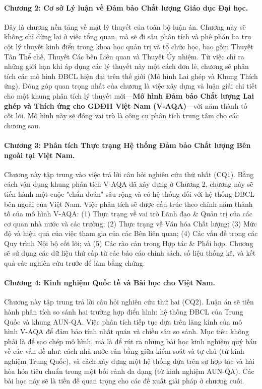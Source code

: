 \documentclass[12pt, a4paper, openany]{report}
\begin{document}
\paragraph{Chương 2: Cơ sở Lý luận về Đảm bảo Chất lượng Giáo dục Đại học.}
Đây là chương nền tảng về mặt lý thuyết của toàn bộ luận án. Chương này sẽ không chỉ dừng lại ở việc tổng quan, mà sẽ đi sâu phân tích và phê phán ba trụ cột lý thuyết kinh điển trong khoa học quản trị và tổ chức học, bao gồm Thuyết Tân Thể chế, Thuyết Các bên Liên quan và Thuyết Ủy nhiệm. Từ việc chỉ ra những giới hạn khi áp dụng các lý thuyết này một cách đơn lẻ, chương sẽ phân tích các mô hình ĐBCL hiện đại trên thế giới (Mô hình Lai ghép và Khung Thích ứng). Đóng góp quan trọng nhất của chương là việc xây dựng và luận giải chi tiết cho một khung phân tích lý thuyết mới—\textbf{Mô hình Đảm bảo Chất lượng Lai ghép và Thích ứng cho GDĐH Việt Nam (V-AQA)}—với năm thành tố cốt lõi. Mô hình này sẽ đóng vai trò là công cụ phân tích trung tâm cho các chương sau.

\paragraph{Chương 3: Phân tích Thực trạng Hệ thống Đảm bảo Chất lượng Bên ngoài tại Việt Nam.}
Chương này tập trung vào việc trả lời câu hỏi nghiên cứu thứ nhất (CQ1). Bằng cách vận dụng khung phân tích V-AQA đã xây dựng ở Chương 2, chương này sẽ tiến hành một cuộc "chẩn đoán" sâu rộng và có hệ thống đối với hệ thống ĐBCL bên ngoài của Việt Nam. Việc phân tích sẽ được cấu trúc theo chính năm thành tố của mô hình V-AQA: (1) Thực trạng về vai trò Lãnh đạo \& Quản trị của các cơ quan nhà nước và các trường; (2) Thực trạng về Văn hóa Chất lượng; (3) Mức độ và hiệu quả của việc tham gia của các Bên liên quan; (4) Các vấn đề trong các Quy trình Nội bộ cốt lõi; và (5) Các rào cản trong Hợp tác \& Phối hợp. Chương sẽ sử dụng các dữ liệu thứ cấp từ các báo cáo chính sách, số liệu thống kê, và kết quả các nghiên cứu trước để làm bằng chứng.

\paragraph{Chương 4: Kinh nghiệm Quốc tế và Bài học cho Việt Nam.}
Chương này tập trung trả lời câu hỏi nghiên cứu thứ hai (CQ2). Luận án sẽ tiến hành phân tích so sánh hai trường hợp điển hình: hệ thống ĐBCL của Trung Quốc và khung AUN-QA. Việc phân tích tiếp tục dựa trên lăng kính của mô hình V-AQA để đảm bảo tính nhất quán và chiều sâu so sánh. Mục tiêu không phải là để sao chép mô hình, mà là để rút ra những bài học kinh nghiệm quý báu về các vấn đề như: cách nhà nước cân bằng giữa kiểm soát và tự chủ (từ kinh nghiệm Trung Quốc), và cách xây dựng một hệ thống dựa trên sự hợp tác và hài hòa hóa tiêu chuẩn trong một bối cảnh đa dạng (từ kinh nghiệm AUN-QA). Các bài học này sẽ là tiền đề quan trọng cho các đề xuất giải pháp ở chương cuối.
\end{document}

